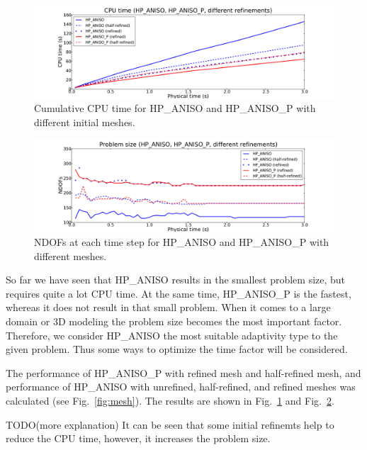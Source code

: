 \begin{figure}
  \begin{centering}
  \includegraphics[width=\columnwidth]{refined_cpu}
  \caption{\label{fig:refined-cpu} Cumulative CPU time for HP\_ANISO and HP\_ANISO\_P
  with different initial meshes.}
  \end{centering}
\end{figure}

\begin{figure}
  \begin{centering}
  \includegraphics[width=\columnwidth]{refined_dof}
  \caption{\label{fig:refined-dof} NDOFs at each time step for
  HP\_ANISO and HP\_ANISO\_P with different meshes.}
  \end{centering}
\end{figure}

So far we have seen that HP\_ANISO results in the smallest problem size, but requires
quite a lot CPU time. At the same time, HP\_ANISO\_P is the fastest, whereas
it does not result in that small problem. When it comes to a large domain 
or 3D modeling the problem
size becomes the most important factor. Therefore, we consider HP\_ANISO the most
suitable adaptivity type to the given problem. Thus some ways to optimize the time
factor will be considered.

The performance of HP\_ANISO\_P with refined mesh and half-refined
mesh, and performance of HP\_ANISO with unrefined, half-refined, and refined
meshes was calculated (see Fig.~\ref{fig:mesh}).
The results are shown in Fig.~\ref{fig:refined-cpu} and Fig.~\ref{fig:refined-dof}.

TODO(more explanation) It can be seen that some initial refinemts help to reduce the CPU time,
however, it increases the problem size.
